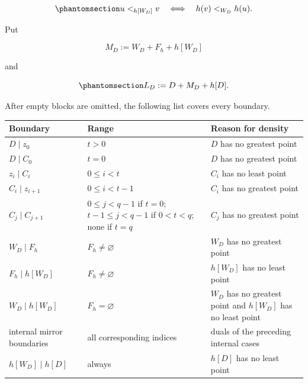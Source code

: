 \documentclass[
  english,
  11pt,
  reqno]{amsart}
\newcounter{none} %
\begin{document}
\begin{equation}\protect\phantomsection\label{eq:typefree-mirror-order}{
u<_{h[W_D]}v
\quad\Longleftrightarrow\quad
h(v)<_{W_D}h(u).
}\end{equation}

Put

\[
M_D:=W_D+F_h+h[W_D]
\]

and

\begin{equation}\protect\phantomsection\label{eq:typefree-localized-order}{
L_D:=D+M_D+h[D].
}\end{equation}

After empty blocks are omitted, the following list covers every
boundary.

{\def\LTcaptype{none} %
\begin{longtable}[]{@{}
  >{\raggedright\arraybackslash}p{}
  >{\raggedright\arraybackslash}p{}
  >{\raggedright\arraybackslash}p{}@{}}
\toprule\noalign{}
\begin{minipage}[b]{\linewidth}\raggedright
Boundary
\end{minipage} & \begin{minipage}[b]{\linewidth}\raggedright
Range
\end{minipage} & \begin{minipage}[b]{\linewidth}\raggedright
Reason for density
\end{minipage} \\
\midrule\noalign{}
\endhead
\bottomrule\noalign{}
\endlastfoot
\(D\mid z_0\) & \(t>0\) & \(D\) has no greatest point \\
\(D\mid C_0\) & \(t=0\) & \(D\) has no greatest point \\
\(z_i\mid C_i\) & \(0\le i<t\) & \(C_i\) has no least point \\
\(C_i\mid z_{i+1}\) & \(0\le i<t-1\) & \(C_i\) has no greatest point \\
\(C_j\mid C_{j+1}\) & \(0\le j<q-1\) if \(t=0\); \(t-1\le j<q-1\) if
\(0<t<q\); none if \(t=q\) & \(C_j\) has no greatest point \\
\(W_D\mid F_h\) & \(F_h\ne\varnothing\) & \(W_D\) has no greatest
point \\
\(F_h\mid h[W_D]\) & \(F_h\ne\varnothing\) & \(h[W_D]\) has no least
point \\
\(W_D\mid h[W_D]\) & \(F_h=\varnothing\) & \(W_D\) has no greatest point
and \(h[W_D]\) has no least point \\
internal mirror boundaries & all corresponding indices & duals of the
preceding internal cases \\
\(h[W_D]\mid h[D]\) & always & \(h[D]\) has no least point \\
\end{longtable}
}
\end{document}

